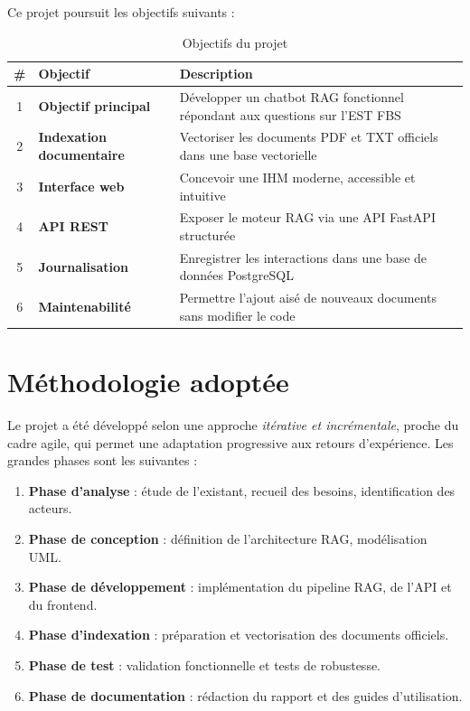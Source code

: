 \documentclass[12pt, a4paper, twoside]{report}
\newcommand{\term}[1]{\textit{\color{primary}#1}}
\begin{document}
Ce projet poursuit les objectifs suivants :

\begin{table}[H]
\centering
\caption{Objectifs du projet}
\label{tab:objectifs}
\begin{tabularx}{\textwidth}{c >{\bfseries}l X}
\toprule
\rowcolor{primary!10}
\# & Objectif & Description \\
\midrule
1 & Objectif principal & Développer un chatbot RAG fonctionnel répondant aux questions sur l'EST FBS \\
2 & Indexation documentaire & Vectoriser les documents PDF et TXT officiels dans une base vectorielle \\
3 & Interface web & Concevoir une IHM moderne, accessible et intuitive \\
4 & API REST & Exposer le moteur RAG via une API FastAPI structurée \\
5 & Journalisation & Enregistrer les interactions dans une base de données PostgreSQL \\
6 & Maintenabilité & Permettre l'ajout aisé de nouveaux documents sans modifier le code \\
\bottomrule
\end{tabularx}
\end{table}

\section{Méthodologie adoptée}

Le projet a été développé selon une approche \term{itérative et incrémentale}, proche du cadre agile, qui permet une adaptation progressive aux retours d'expérience. Les grandes phases sont les suivantes :

\begin{enumerate}
  \item \textbf{Phase d'analyse} : étude de l'existant, recueil des besoins, identification des acteurs.
  \item \textbf{Phase de conception} : définition de l'architecture RAG, modélisation UML.
  \item \textbf{Phase de développement} : implémentation du pipeline RAG, de l'API et du frontend.
  \item \textbf{Phase d'indexation} : préparation et vectorisation des documents officiels.
  \item \textbf{Phase de test} : validation fonctionnelle et tests de robustesse.
  \item \textbf{Phase de documentation} : rédaction du rapport et des guides d'utilisation.
\end{enumerate}
\end{document}
